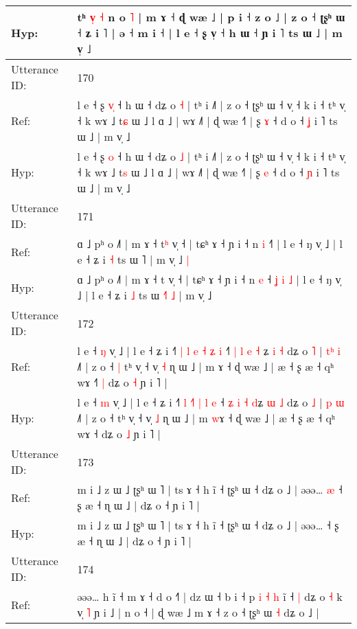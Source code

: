 \documentclass[10pt]{article}
\DeclareRobustCommand{\hl}[1]{{\textcolor{red}{#1}}}
\begin{document}
\begin{longtable}{ll}
Hyp: & \hl{}\hl{}\hl{}\hl{}\hl{}tʰ\hl{}\hl{} \hl{v}\hl{̩} \hl{˧} n o \hl{˥} | m ɤ ˧ ɖ wæ ˩ | p i ˧ z o ˩ | z o ˧ ʈʂʰ ɯ ˧ ʑ i \hl{}˥ | ə ˧ m i\hl{}\hl{}\hl{}\hl{}\hl{}\hl{} ˧ | l e ˧ ʂ v̩ ˧ h ɯ ˧ ɲ i ˥ ts ɯ ˩ | m v̩ ˩
 \\
\midrule
Utterance ID: & 170 \\
Ref: & l e ˧ ʂ \hl{v}\hl{̩} ˧ h ɯ ˧ dʑ o \hl{˧} | tʰ i ˩˥ | z o ˧ ʈʂʰ ɯ ˧ v̩ ˧ k i ˧ tʰ v̩ ˧ k wɤ ˩ t\hl{ɕ} ɯ ˩ l ɑ ˩ | wɤ ˩˥ | ɖ wæ ˧˥ | ʂ \hl{ɤ} ˧ d o ˧ \hl{ʝ} i ˥ ts ɯ ˩ | m v̩ ˩
 \\
Hyp: & l e ˧ ʂ \hl{}\hl{o} ˧ h ɯ ˧ dʑ o \hl{˩} | tʰ i ˩˥ | z o ˧ ʈʂʰ ɯ ˧ v̩ ˧ k i ˧ tʰ v̩ ˧ k wɤ ˩ t\hl{s} ɯ ˩ l ɑ ˩ | wɤ ˩˥ | ɖ wæ ˧˥ | ʂ \hl{e} ˧ d o ˧ \hl{ɲ} i ˥ ts ɯ ˩ | m v̩ ˩
 \\
\midrule
Utterance ID: & 171 \\
Ref: & ɑ ˩ pʰ o ˩˥ | m ɤ ˧ t\hl{ʰ} v̩ ˧ | tɕʰ ɤ ˧ ɲ i ˧ n \hl{i} ˧\hl{}\hl{}\hl{}\hl{}\hl{}\hl{˥} | l e ˧ ŋ v̩ ˩ | l e ˧ ʑ i \hl{˧} ts ɯ \hl{}˥\hl{}\hl{} | m v̩ ˩\hl{ }\hl{|}
 \\
Hyp: & ɑ ˩ pʰ o ˩˥ | m ɤ ˧ t\hl{} v̩ ˧ | tɕʰ ɤ ˧ ɲ i ˧ n \hl{e} ˧\hl{ }\hl{ʝ}\hl{ }\hl{i}\hl{ }\hl{˩} | l e ˧ ŋ v̩ ˩ | l e ˧ ʑ i \hl{˩} ts ɯ \hl{˧}˥\hl{ }\hl{˩} | m v̩ ˩\hl{}\hl{}
 \\
\midrule
Utterance ID: & 172 \\
Ref: & l e ˧ \hl{ŋ} v̩ ˩ | l e ˧ ʑ i ˧˥ \hl{|} \hl{l}\hl{ }\hl{e} \hl{˧} \hl{ʑ} \hl{i} ˧\hl{˥} \hl{|} \hl{l} \hl{e} \hl{˧}\hl{ }ʑ \hl{i} \hl{˧} dʑ o \hl{˥} | \hl{t}\hl{ʰ} \hl{i} ˩˥ | z o ˧\hl{ }\hl{|} tʰ v̩ ˧ v̩ \hl{˧} ɳ ɯ ˩ | m \hl{}ɤ ˧ ɖ wæ ˩ | æ ˧ ʂ æ ˧ qʰ wɤ ˧\hl{˥}\hl{ }\hl{|} dʑ o \hl{˧} ɲ i ˥ |
 \\
Hyp: & l e ˧ \hl{m} v̩ ˩ | l e ˧ ʑ i ˧˥ \hl{l} \hl{}\hl{˧}\hl{˥} \hl{|} \hl{l} \hl{e} ˧\hl{} \hl{ʑ} \hl{i} \hl{˧} \hl{}\hl{d}ʑ \hl{ɯ} \hl{˩} dʑ o \hl{˩} | \hl{}\hl{p} \hl{ɯ} ˩˥ | z o ˧\hl{}\hl{} tʰ v̩ ˧ v̩ \hl{˩} ɳ ɯ ˩ | m \hl{w}ɤ ˧ ɖ wæ ˩ | æ ˧ ʂ æ ˧ qʰ wɤ ˧\hl{}\hl{}\hl{} dʑ o \hl{˩} ɲ i ˥ |
 \\
\midrule
Utterance ID: & 173 \\
Ref: & m i ˩ z ɯ ˩ ʈʂʰ ɯ ˥ | ts ɤ ˧ h ĩ ˧ ʈʂʰ ɯ ˧ dʑ o ˩ | əəə…\hl{ }\hl{æ} ˧ ʂ æ ˧ ɳ ɯ ˩ | dʑ o ˧ ɲ i ˥ |
 \\
Hyp: & m i ˩ z ɯ ˩ ʈʂʰ ɯ ˥ | ts ɤ ˧ h ĩ ˧ ʈʂʰ ɯ ˧ dʑ o ˩ | əəə…\hl{}\hl{} ˧ ʂ æ ˧ ɳ ɯ ˩ | dʑ o ˧ ɲ i ˥ |
 \\
\midrule
Utterance ID: & 174 \\
Ref: & əəə… h ĩ ˧ m ɤ ˧ d o ˧˥ | dz ɯ ˧ b i ˧ p\hl{ }\hl{i}\hl{ }\hl{˧}\hl{ }\hl{h} i\hl{̃} ˧\hl{ }\hl{|} dʑ o \hl{˧} k v̩ \hl{˥} ɲ i ˩ | n o ˧ | ɖ wæ ˩ m ɤ ˧ z o ˧ ʈʂʰ ɯ \hl{˧} dʑ o ˩ |

\end{longtable}
\end{document}
